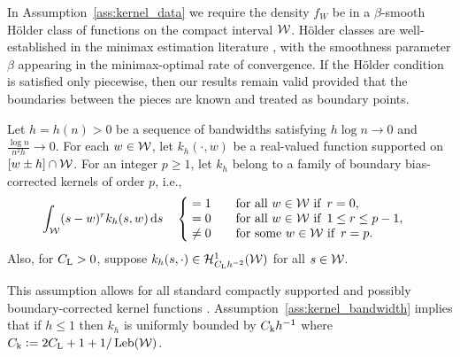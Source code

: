 In Assumption~\ref{ass:kernel_data} we require
the density $f_W$ be in a $\beta$-smooth H\"older class of
functions on the compact interval $\mathcal{W}$.
H\"older classes are well-established in the minimax estimation literature
\citep{gine2021mathematical}, with the smoothness parameter $\beta$ appearing
in the minimax-optimal rate of convergence.
If the H\"older condition is satisfied only piecewise,
then our results remain valid provided that the boundaries
between the pieces are known and treated as boundary points.


\begin{assumption}\label{ass:kernel_bandwidth}%
  \onehalfspacing

  Let $h = h(n) > 0$
  be a sequence of bandwidths
  satisfying $h \log n \to 0$
  and $\frac{\log n}{n^2h} \to 0$.
  For each $w \in \mathcal{W}$, let $k_h(\cdot, w)$
  be a real-valued function supported on
  $[w \pm h] \cap \mathcal{W}$.
  For an integer $p \geq 1$,
  let $k_h$ belong to a family of
  boundary bias-corrected kernels of order $p$, i.e.,
  \begin{align*}
    \int_{\mathcal{W}}
    (s-w)^r k_h(s,w) \,\mathrm{d}s
    \quad
    \begin{cases}
      \begin{alignedat}{2}
        &= 1 &\qquad &\text{for all } w \in \mathcal{W} \text{ if }\, r = 0, \\
        &= 0 & &\text{for all } w \in \mathcal{W} \text{ if }\, 1 \leq r \leq p-1, \\
        &\neq 0 & &\text{for some } w \in \mathcal{W} \text{ if }\, r = p.
      \end{alignedat}
    \end{cases}
  \end{align*}
  Also, for $C_\mathrm{L} > 0$,
  suppose $k_h(s, \cdot) \in \mathcal{H}^1_{C_\mathrm{L} h^{-2}}(\mathcal{W})$
  for all $s \in \mathcal{W}$.
\end{assumption}

This assumption allows for all standard compactly supported
and possibly boundary-corrected kernel functions
\citep{wand1994kernel,simonoff2012smoothing}.
Assumption~\ref{ass:kernel_bandwidth} implies that
if $h \leq 1$ then
$k_h$ is uniformly bounded by
$C_\mathrm{k} h^{-1}$ where $C_\mathrm{k} \vcentcolon = 2 C_\mathrm{L} + 1 + 1/\operatorname{Leb}(\mathcal{W})$.

